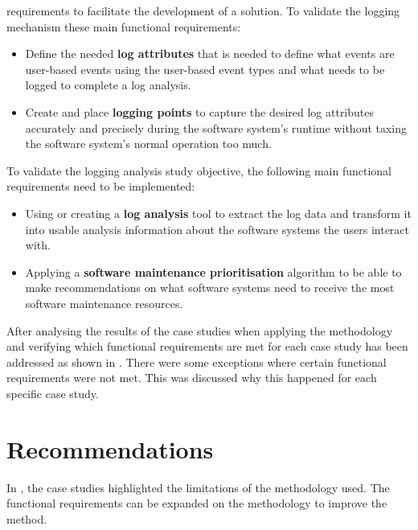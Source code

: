 \begin{enumerate}[label=\textbf{\Roman*.}]
	requirements to facilitate the development of a solution. To validate the logging mechanism
	these main functional requirements:
	 \begin{itemize}
		\item Define the needed \textbf{log attributes} that is needed to define what events are
		user-based events using the user-based event types and what needs to be logged to complete a
		log analysis.
		\item Create and place \textbf{logging points} to capture the desired log attributes
		accurately and precisely during the software system's runtime without taxing the software
		system's normal operation too much.
	 \end{itemize}

	 To validate the logging analysis study objective, the following main functional requirements
	 need to be implemented:
	 \begin{itemize}
		\item Using or creating a \textbf{log analysis} tool to extract the log data and transform
		it into usable analysis information about the software systems the users interact with.
		\item Applying a \textbf{software maintenance prioritisation} algorithm to be able to make
		recommendations on what software systems need to receive the most software maintenance
		resources.
	 \end{itemize}

	 After analysing the results of the case studies when applying the methodology and verifying
	 which functional requirements are met for each case study has been addressed as shown in
	 . There were some exceptions where certain functional
	 requirements were not met. This was discussed why this happened for each specific case study.
\end{enumerate}

\section{Recommendations}
In , the case studies highlighted the limitations of the methodology used.
The functional requirements can be expanded on the methodology to improve the method.

